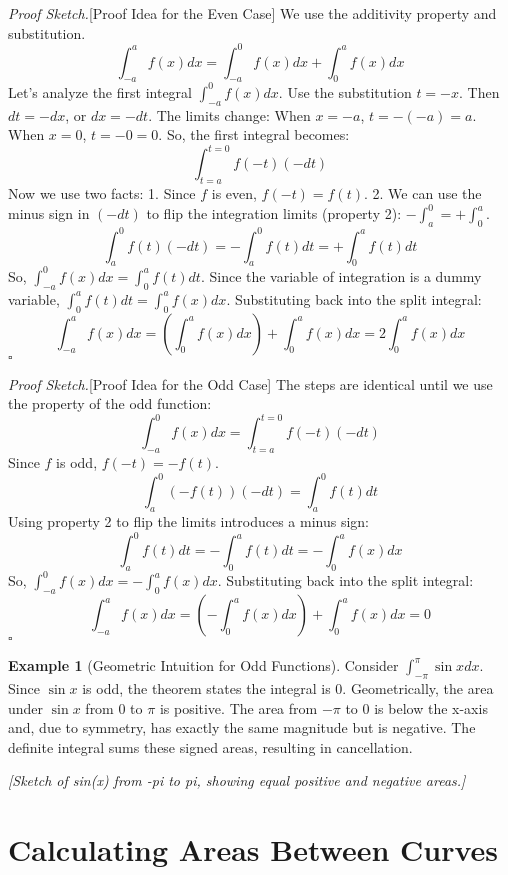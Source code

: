 \documentclass[11pt]{article}
\theoremstyle{definition}
\newtheorem{example}[theorem]{Example}
\theoremstyle{remark} %
\newenvironment{proofsketch}{\noindent\textit{Proof Sketch.}}{\hfill$\square$}
\begin{document}
\begin{proofsketch}[Proof Idea for the Even Case]
We use the additivity property and substitution.
\[
\int_{-a}^a f(x) dx = \int_{-a}^0 f(x) dx + \int_0^a f(x) dx
\]
Let's analyze the first integral $\int_{-a}^0 f(x) dx$. Use the substitution $t = -x$.
Then $dt = -dx$, or $dx = -dt$.
The limits change: When $x=-a$, $t = -(-a) = a$. When $x=0$, $t = -0 = 0$.
So, the first integral becomes:
\[
\int_{t=a}^{t=0} f(-t) (-dt)
\]
Now we use two facts:
1.  Since $f$ is even, $f(-t) = f(t)$.
2.  We can use the minus sign in $(-dt)$ to flip the integration limits (property 2): $-\int_a^0 = +\int_0^a$.
\[
\int_{a}^{0} f(t) (-dt) = - \int_{a}^{0} f(t) dt = + \int_{0}^{a} f(t) dt
\]
So, $\int_{-a}^0 f(x) dx = \int_0^a f(t) dt$. Since the variable of integration is a dummy variable, $\int_0^a f(t) dt = \int_0^a f(x) dx$.
Substituting back into the split integral:
\[
\int_{-a}^a f(x) dx = \left( \int_0^a f(x) dx \right) + \int_0^a f(x) dx = 2 \int_0^a f(x) dx
\]
\end{proofsketch}

\begin{proofsketch}[Proof Idea for the Odd Case]
The steps are identical until we use the property of the odd function:
\[
\int_{-a}^0 f(x) dx = \int_{t=a}^{t=0} f(-t) (-dt)
\]
Since $f$ is odd, $f(-t) = -f(t)$.
\[
\int_{a}^{0} (-f(t)) (-dt) = \int_{a}^{0} f(t) dt
\]
Using property 2 to flip the limits introduces a minus sign:
\[
\int_{a}^{0} f(t) dt = - \int_{0}^{a} f(t) dt = - \int_{0}^{a} f(x) dx
\]
So, $\int_{-a}^0 f(x) dx = - \int_0^a f(x) dx$.
Substituting back into the split integral:
\[
\int_{-a}^a f(x) dx = \left( - \int_0^a f(x) dx \right) + \int_0^a f(x) dx = 0
\]
\end{proofsketch}

\begin{example}[Geometric Intuition for Odd Functions]
Consider $\int_{-\pi}^{\pi} \sin x dx$. Since $\sin x$ is odd, the theorem states the integral is 0.
Geometrically, the area under $\sin x$ from $0$ to $\pi$ is positive. The area from $-\pi$ to $0$ is below the x-axis and, due to symmetry, has exactly the same magnitude but is negative. The definite integral sums these signed areas, resulting in cancellation.
\begin{center}
\textit{[Sketch of sin(x) from -pi to pi, showing equal positive and negative areas.]}
\end{center}
\end{example}

\section{Calculating Areas Between Curves}
\end{document}
